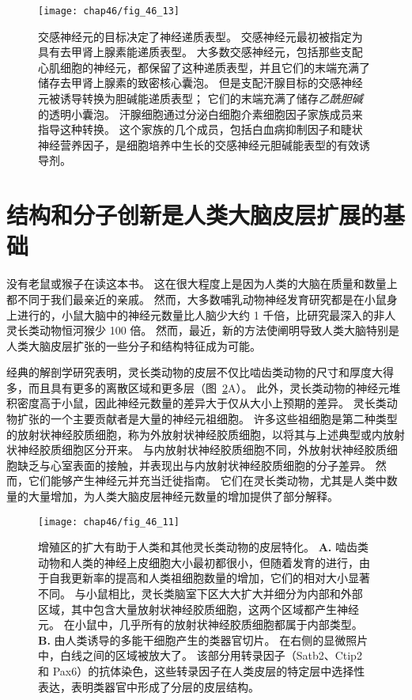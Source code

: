\begin{figure}[htbp]
	\centering
	\texttt{[image: chap46/fig\_46\_13]}
	\caption{交感神经元的目标决定了神经递质表型。
		交感神经元最初被指定为具有去甲肾上腺素能递质表型。
		大多数交感神经元，包括那些支配心肌细胞的神经元，都保留了这种递质表型，并且它们的末端充满了储存去甲肾上腺素的致密核心囊泡。
		但是支配汗腺目标的交感神经元被诱导转换为胆碱能递质表型；
		它们的末端充满了储存\textit{乙酰胆碱}的透明小囊泡。
		汗腺细胞通过分泌白细胞介素细胞因子家族成员来指导这种转换。
		这个家族的几个成员，包括白血病抑制因子和睫状神经营养因子，是细胞培养中生长的交感神经元胆碱能表型的有效诱导剂。}
	\label{fig:46_13}
\end{figure}



\section{结构和分子创新是人类大脑皮层扩展的基础}

没有老鼠或猴子在读这本书。
这在很大程度上是因为人类的大脑在质量和数量上都不同于我们最亲近的亲戚。
然而，大多数哺乳动物神经发育研究都是在小鼠身上进行的，小鼠大脑中的神经元数量比人脑少大约 1 千倍，比研究最深入的非人灵长类动物恒河猴少 100 倍。
然而，最近，新的方法使阐明导致人类大脑特别是人类大脑皮层扩张的一些分子和结构特征成为可能。


经典的解剖学研究表明，灵长类动物的皮层不仅比啮齿类动物的尺寸和厚度大得多，而且具有更多的离散区域和更多层（图~\ref{fig:46_11}A）。
此外，灵长类动物的神经元堆积密度高于小鼠，因此神经元数量的差异大于仅从大小上预期的差异。
灵长类动物扩张的一个主要贡献者是大量的神经元祖细胞。
许多这些祖细胞是第二种类型的放射状神经胶质细胞，称为外放射状神经胶质细胞，以将其与上述典型或内放射状神经胶质细胞区分开来。
与内放射状神经胶质细胞不同，外放射状神经胶质细胞缺乏与心室表面的接触，并表现出与内放射状神经胶质细胞的分子差异。
然而，它们能够产生神经元并充当迁徙指南。
它们在灵长类动物，尤其是人类中数量的大量增加，为人类大脑皮层神经元数量的增加提供了部分解释。


\begin{figure}[htbp]
	\centering
	\texttt{[image: chap46/fig\_46\_11]}
	\caption{增殖区的扩大有助于人类和其他灵长类动物的皮层特化。
		\textbf{A.} 啮齿类动物和人类的神经上皮细胞大小最初都很小，但随着发育的进行，由于自我更新率的提高和人类祖细胞数量的增加，它们的相对大小显著不同。
		与小鼠相比，灵长类脑室下区大大扩大并细分为内部和外部区域，其中包含大量放射状神经胶质细胞，这两个区域都产生神经元。
		在小鼠中，几乎所有的放射状神经胶质细胞都属于内部类型\cite{giandomenico2017probing}。
		\textbf{B.} 由人类诱导的多能干细胞产生的类器官切片。
		在右侧的显微照片中，白线之间的区域被放大了。
		该部分用转录因子（Satb2、Ctip2 和 Pax6）的抗体染色，这些转录因子在人类皮层的特定层中选择性表达，表明类器官中形成了分层的皮层结构。}
	\label{fig:46_11}
\end{figure}


